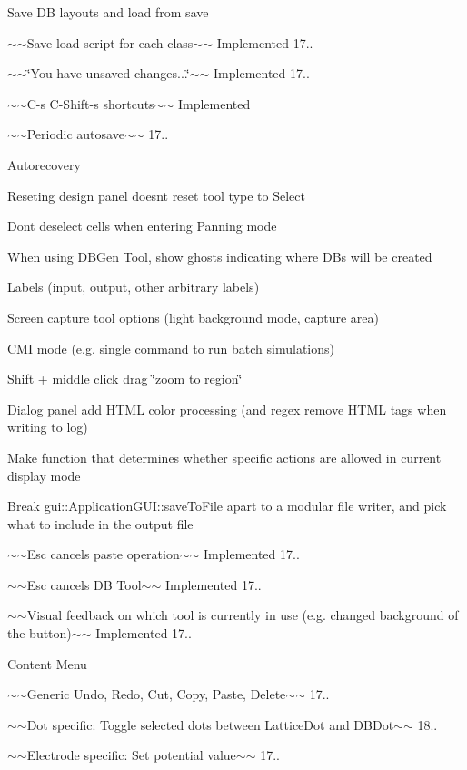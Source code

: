 \begin{DoxyItemize}
\item Save DB layouts and load from save
\begin{DoxyItemize}
\item $\sim$$\sim$\+Save load script for each class$\sim$$\sim$ Implemented 17..
\item $\sim$$\sim$\char`\"{}\+You have unsaved changes...\char`\"{}$\sim$$\sim$ Implemented 17..
\item $\sim$$\sim$\+C-\/s C-\/\+Shift-\/s shortcuts$\sim$$\sim$ Implemented
\item $\sim$$\sim$\+Periodic autosave$\sim$$\sim$ 17..
\item Autorecovery
\end{DoxyItemize}
\item Reseting design panel doesn\textquotesingle{}t reset tool type to Select
\item Don\textquotesingle{}t deselect cells when entering Panning mode
\item When using D\+B\+Gen Tool, show ghosts indicating where D\+Bs will be created
\item Labels (input, output, other arbitrary labels)
\item Screen capture tool options (light background mode, capture area)
\item C\+MI mode (e.\+g. single command to run batch simulations)
\item Shift + middle click drag \char`\"{}zoom to region\char`\"{}
\item Dialog panel add H\+T\+ML color processing (and regex remove H\+T\+ML tags when writing to log)
\item Make function that determines whether specific actions are allowed in current display mode
\item Break gui\+::\+Application\+G\+U\+I\+::save\+To\+File apart to a modular file writer, and pick what to include in the output file
\item $\sim$$\sim$\+Esc cancels paste operation$\sim$$\sim$ Implemented 17..
\item $\sim$$\sim$\+Esc cancels DB Tool$\sim$$\sim$ Implemented 17..
\item $\sim$$\sim$\+Visual feedback on which tool is currently in use (e.\+g. changed background of the button)$\sim$$\sim$ Implemented 17..
\item Content Menu
\begin{DoxyItemize}
\item $\sim$$\sim$\+Generic Undo, Redo, Cut, Copy, Paste, Delete$\sim$$\sim$ 17..
\item $\sim$$\sim$\+Dot specific\+: Toggle selected dots between Lattice\+Dot and D\+B\+Dot$\sim$$\sim$ 18..
\item $\sim$$\sim$\+Electrode specific\+: Set potential value$\sim$$\sim$ 17..
\end{DoxyItemize}
\end{DoxyItemize}

